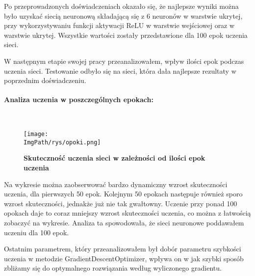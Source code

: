 \documentclass[a4paper,12pt,twoside,openany]{report}
\newcommand{\ImgPath}{.}
\begin{document}
	Po przeprowadzonych doświadczeniach okazało się, że najlepsze wyniki można było uzyskać siecią neuronową składającą się z 6 neuronów w warstwie ukrytej, przy wykorzystywaniu funkcji aktywacji ReLU w warstwie wejściowej oraz w warstwie ukrytej. Wszystkie wartości zostały przedstawione dla 100 epok uczenia sieci.
	
	W następnym etapie swojej pracy przeanalizowałem, wpływ ilości epok podczas uczenia sieci. Testowanie odbyło się na sieci, która dała najlepsze rezultaty w poprzednim doświadczeniu.
	\paragraph{Analiza uczenia w poszczególnych epokach:}
	\mbox{}\\
	
	\begin{figure}[H]
		\centering
		{\label{fig:b}\texttt{[image: \\ImgPath/rys/opoki.png]}}
		\caption{  \textbf{Skuteczność uczenia sieci w zależności od ilości epok uczenia}}
	\end{figure}

	Na wykresie można zaobserwować bardzo dynamiczny wzrost skuteczności uczenia, dla pierwszych 50 epok. Kolejnym 50 epokach następuje również sporo wzrost skuteczności, jednakże już nie tak gwałtowny. Uczenie przy ponad 100 opokach daje to coraz mniejszy wzrost skuteczności uczenia, co można z łatwością zobaczyć na wykresie. Analiza ta spowodowała, że sieci neuronowe poddawałem uczeniu dla 100 epok.
	
	Ostatnim parametrem, który przeanalizowałem był dobór parametru szybkości uczenia w metodzie GradientDescentOptimizer, wpływa on w jak szybki sposób zbliżamy się do optymalnego rozwiązania według wyliczonego gradientu.
	
\end{document}
